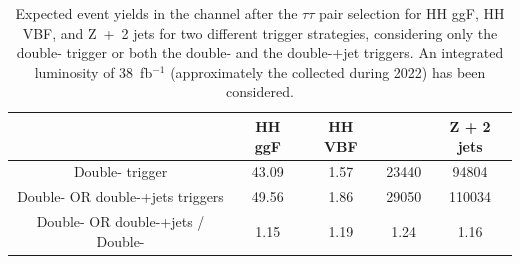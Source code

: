 \documentclass[../main.tex]{subfiles}
\begin{document}
\begin{table}[h!]
\begin{small}
\begin{center}
\begin{tabular}{c | c c c c}
                                                                             & HH ggF & HH VBF & \ttbar{} & Z + 2 jets \\\hline
Double-\tauh{} trigger                                                        & 43.09   & 1.57   & 23440 & 94804      \\
Double-\tauh{} OR double-\tauh{}+jets triggers                                & 49.56   & 1.86   & 29050  & 110034      \\
Double-\tauh{} OR double-\tauh{}+jets / Double-\tauh{}                        & 1.15   & 1.19   & 1.24  & 1.16      

\end{tabular}
\end{center}
\end{small}

\caption{Expected event yields in the \tauh\tauh{} channel after the \hhbbtt{} $\tau\tau$ pair selection for HH ggF, HH VBF, \ttbar{} and Z~+~2 jets for two different trigger strategies, considering only the double-\tauh{} trigger or both the double-\tauh{} and the double-\tauh{}+jet triggers. An integrated luminosity of 38~fb${}^{-1}$ (approximately the collected during 2022) has been considered.}
\label{hh:tab:doubletaujet_sensitivity}
\end{table}
\end{document}
